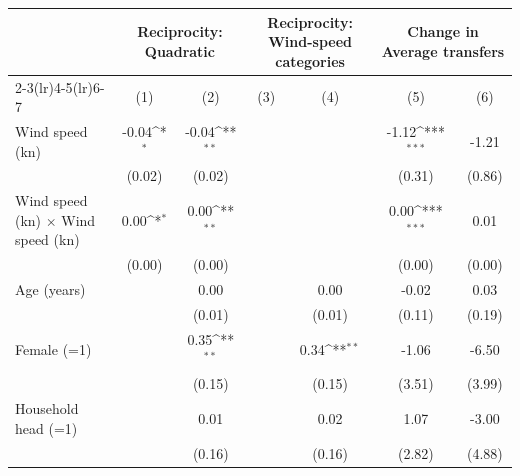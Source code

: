 {
\def\sym#1{\ifmmode^{#1}\else\(^{#1}\)\fi}
\begin{tabular}{l*{6}{c}}
\toprule
                    &\multicolumn{2}{c}{Reciprocity: Quadratic} &\multicolumn{2}{c}{Reciprocity: Wind-speed categories}&\multicolumn{2}{c}{Change in Average transfers}\\\cmidrule(lr){2-3}\cmidrule(lr){4-5}\cmidrule(lr){6-7}
                    &\multicolumn{1}{c}{(1)}         &\multicolumn{1}{c}{(2)}         &\multicolumn{1}{c}{(3)}         &\multicolumn{1}{c}{(4)}         &\multicolumn{1}{c}{(5)}         &\multicolumn{1}{c}{(6)}         \\
\midrule
Wind speed (kn)     &       -0.04\sym{*}  &       -0.04\sym{**} &                     &                     &       -1.12\sym{***}&       -1.21         \\
                    &      (0.02)         &      (0.02)         &                     &                     &      (0.31)         &      (0.86)         \\
Wind speed (kn) $\times$ Wind speed (kn)&        0.00\sym{*}  &        0.00\sym{**} &                     &                     &        0.00\sym{***}&        0.01         \\
                    &      (0.00)         &      (0.00)         &                     &                     &      (0.00)         &      (0.00)         \\
Age (years)         &                     &        0.00         &                     &        0.00         &       -0.02         &        0.03         \\
                    &                     &      (0.01)         &                     &      (0.01)         &      (0.11)         &      (0.19)         \\
Female (=1)         &                     &        0.35\sym{**} &                     &        0.34\sym{**} &       -1.06         &       -6.50         \\
                    &                     &      (0.15)         &                     &      (0.15)         &      (3.51)         &      (3.99)         \\
Household head (=1) &                     &        0.01         &                     &        0.02         &        1.07         &       -3.00         \\
                    &                     &      (0.16)         &                     &      (0.16)         &      (2.82)         &      (4.88)         \\

\end{tabular}}
